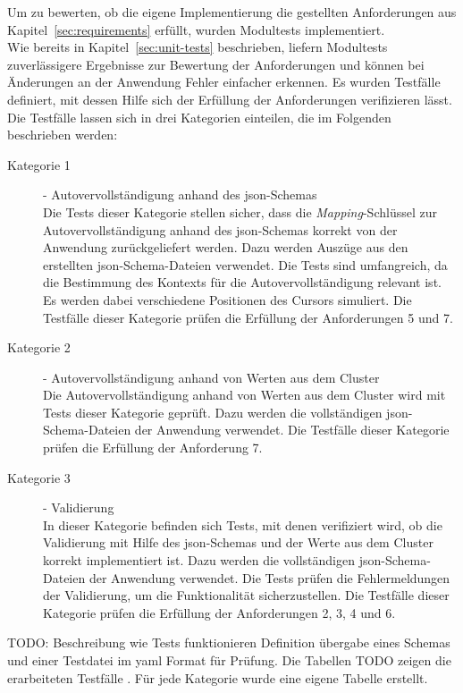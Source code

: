 Um zu bewerten, ob die eigene Implementierung die gestellten Anforderungen aus Kapitel~\ref{sec:requirements} erfüllt, wurden
Modultests implementiert. \\
Wie bereits in Kapitel~\ref{sec:unit-tests} beschrieben, liefern Modultests zuverlässigere Ergebnisse zur Bewertung der Anforderungen und können bei Änderungen
an der Anwendung Fehler einfacher erkennen.
Es wurden Testfälle definiert, mit dessen Hilfe sich der Erfüllung der Anforderungen
verifizieren lässt. Die Testfälle lassen sich in drei Kategorien einteilen, die im Folgenden beschrieben werden:

\begin{description}
  \item[Kategorie 1]{- Autovervollständigung anhand des \ac{json}-Schemas\\}
        Die Tests dieser Kategorie stellen sicher,
        dass die \textit{Mapping}-Schlüssel zur Autovervollständigung anhand des \ac{json}-Schemas korrekt von der Anwendung zurückgeliefert werden.
        Dazu werden Auszüge aus den erstellten \ac{json}-Schema-Dateien verwendet. Die Tests sind umfangreich,
        da die Bestimmung des Kontexts für die Autovervollständigung relevant ist. Es werden dabei verschiedene Positionen des Cursors simuliert.
        Die Testfälle dieser Kategorie prüfen die Erfüllung der Anforderungen 5 und 7.
  \item[Kategorie 2]{- Autovervollständigung anhand von Werten aus dem Cluster\\}
        Die Autovervollständigung anhand von Werten aus dem Cluster wird mit Tests dieser Kategorie geprüft.
        Dazu werden die vollständigen \ac{json}-Schema-Dateien der Anwendung verwendet.
        Die Testfälle dieser Kategorie prüfen die Erfüllung der Anforderung 7.
  \item[Kategorie 3]{- Validierung\\}
        In dieser Kategorie befinden sich Tests, mit denen verifiziert wird, ob die Validierung mit Hilfe des \ac{json}-Schemas
        und der Werte aus dem Cluster korrekt implementiert ist. Dazu werden die vollständigen \ac{json}-Schema-Dateien der Anwendung verwendet.
        Die Tests prüfen die Fehlermeldungen der Validierung, um die Funktionalität sicherzustellen.
        Die Testfälle dieser Kategorie prüfen die Erfüllung der Anforderungen 2, 3, 4 und 6.

\end{description}

TODO: Beschreibung wie Tests funktionieren Definition übergabe eines Schemas und einer Testdatei im yaml Format für Prüfung.
Die Tabellen TODO zeigen die erarbeiteten Testfälle .
Für jede Kategorie wurde eine eigene Tabelle erstellt.

